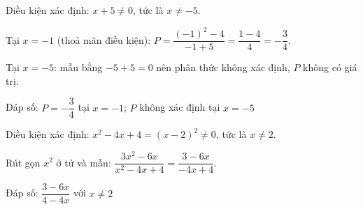\begin{problem}[8DS-PS-011]
Điều kiện xác định: $x + 5 \neq 0$, tức là $x \neq -5$.

Tại $x = -1$ (thoả mãn điều kiện): $P = \dfrac{(-1)^2 - 4}{-1 + 5} = \dfrac{1 - 4}{4} = -\dfrac{3}{4}$.

Tại $x = -5$: mẫu bằng $-5 + 5 = 0$ nên phân thức không xác định, $P$ không có giá trị.

Đáp số: $P = -\dfrac{3}{4}$ tại $x = -1$; $P$ không xác định tại $x = -5$
\end{problem}

\begin{problem}[8DS-PS-002]
Điều kiện xác định: $x^2 - 4x + 4 = (x - 2)^2 \neq 0$, tức là $x \neq 2$.

Rút gọn $x^2$ ở tử và mẫu: $\dfrac{3x^2 - 6x}{x^2 - 4x + 4} = \dfrac{3 - 6x}{-4x + 4}$.

Đáp số: $\dfrac{3 - 6x}{4 - 4x}$ với $x \neq 2$
\end{problem}

